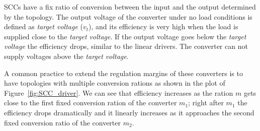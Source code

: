 SCCs have a fix ratio of conversion between the input and the output determined by the topology. The output voltage of the converter under no load conditions is defined as \emph{target voltage} ($v_t$), and its efficiency is very high when the load is supplied close to the \emph{target voltage}. If the output voltage goes below the \emph{target voltage} the efficiency drops, similar to the linear drivers.  The converter can not supply voltages above the \emph{target voltage}.

A common practice to extend the regulation margins of these converters is to have topologies with multiple conversion rations as shown in the plot of Figure~\ref{fig:SCC_driver}. We can see that efficiency increases as the ration $m$ gets close to the first fixed conversion ration of the converter $m_1$; right after $m_1$ the efficiency drops dramatically and it linearly increases as it approaches the second fixed conversion ratio of the converter $m_2$.

